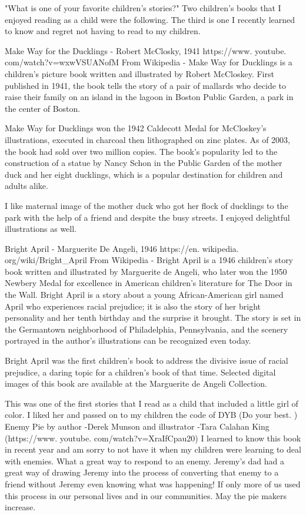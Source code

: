"What is one of your favorite children's stories?"
Two children's books that I enjoyed reading as a child were the following.
The third is one I recently learned to know and regret not having to read to my children.

Make Way for the Ducklings - Robert McClosky, 1941 https://www.
youtube.
com/watch?v=wxwVSUANofM 
From Wikipedia - Make Way for Ducklings is a children's picture book written and illustrated by Robert McCloskey.
First published in 1941, the book tells the story of a pair of mallards who decide to raise their family on an island in the lagoon in Boston Public Garden, a park in the center of Boston.

Make Way for Ducklings won the 1942 Caldecott Medal for McCloskey's illustrations, executed in charcoal then lithographed on zinc plates.
As of 2003, the book had sold over two million copies.
The book's popularity led to the construction of a statue by Nancy Schon in the Public Garden of the mother duck and her eight ducklings, which is a popular destination for children and adults alike.

I like maternal image of the mother duck who got her flock of ducklings to the park with the help of a friend and despite the busy streets.
I enjoyed delightful illustrations as well.

Bright April - Marguerite De Angeli, 1946 https://en.
wikipedia.
org/wiki/Bright\_April 
From Wikipedia - Bright April is a 1946 children's story book written and illustrated by Marguerite de Angeli, who later won the 1950 Newbery Medal for excellence in American children's literature for The Door in the Wall.
Bright April is a story about a young African-American girl named April who experiences racial prejudice; it is also the story of her bright personality and her tenth birthday and the surprise it brought.
The story is set in the Germantown neighborhood of Philadelphia, Pennsylvania, and the scenery portrayed in the author's illustrations can be recognized even today.

Bright April was the first children's book to address the divisive issue of racial prejudice, a daring topic for a children's book of that time.
Selected digital images of this book are available at the Marguerite de Angeli Collection.

This was one of the first stories that I read as a child that included a little girl of color.
I liked her and passed on to my children the code of DYB (Do your best.
)
Enemy Pie by author -Derek Munson and illustrator -Tara Calahan King (https://www.
youtube.
com/watch?v=XraIfCpau20)
I learned to know this book in recent year and am sorry to not have it when my children were learning to deal with enemies.
What a great way to respond to an enemy.
Jeremy's dad had a great way of drawing Jeremy into the process of converting that enemy to a friend without Jeremy even knowing what was happening! If only more of us used this process in our personal lives and in our communities.
May the pie makers increase.






